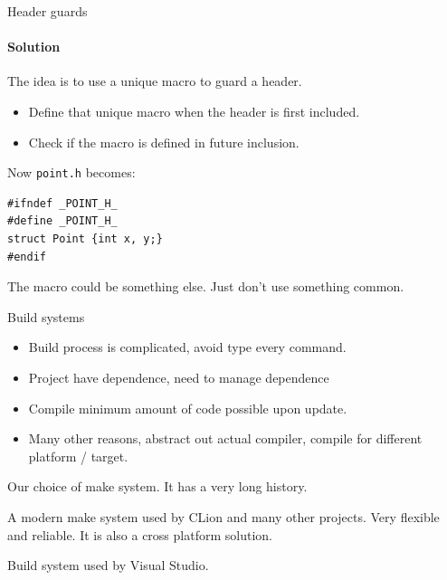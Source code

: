 \begin{frame}[fragile]{Header guards}
\framesubtitle{Solution}
The idea is to use a unique macro to guard a header.
\begin{itemize}
	\item Define that unique macro when the header is first included.
	\item Check if the macro is defined in future inclusion.
\end{itemize}

Now \texttt{point.h} becomes:

\begin{verbatim} 
#ifndef _POINT_H_
#define _POINT_H_
struct Point {int x, y;}
#endif
\end{verbatim}

The macro could be something else. Just don't use something common.

\end{frame}

\begin{frame}{Build systems}
\begin{itemize}
	\item Build process is complicated, avoid type every command.
	\item Project have dependence, need to manage dependence
	\item Compile minimum amount of code possible upon update.
	\item Many other reasons, abstract out actual compiler, compile for different platform / target.
\end{itemize}
\begin{description}
	\item[GNU/make] Our choice of make system. It has a very long history.
	\item[CMake] A modern make system used by CLion and many other projects. Very flexible and reliable. It is also a cross platform solution.
	\item[MSBuild] Build system used by Visual Studio.
\end{description}
\end{frame}

